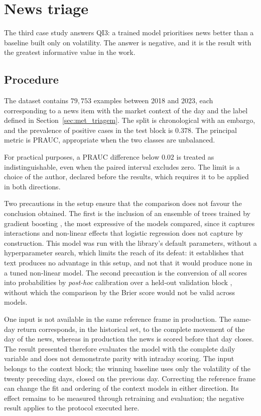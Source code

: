 \section{News triage}
\label{sec:av_qi3}

The third case study answers \gls{QI}3: a trained model prioritises news better than a baseline
built only on volatility. The answer is negative, and it is the result with the greatest
informative value in the work.

\subsection{Procedure}

The dataset contains $79{,}753$ examples between 2018 and 2023, each corresponding to a news item
with the market context of the day and the label defined in Section~\ref{sec:met_triagem}. The
split is chronological with an embargo, and the prevalence of positive cases in the test block is
$0.378$. The principal metric is \gls{PRAUC}, appropriate when the two classes are
unbalanced.

For practical purposes, a \gls{PRAUC} difference below $0.02$ is treated as indistinguishable,
even when the paired interval excludes zero. The limit is a choice of the author, declared before
the results, which requires it to be applied in both directions.

Two precautions in the setup ensure that the comparison does not favour the conclusion obtained.
The first is the inclusion of an ensemble of trees trained by gradient boosting
\autocite{friedman2001gbm}, the most expressive of the models compared, since it captures
interactions and non-linear effects that logistic regression does not capture by construction. This
model was run with the library's default parameters, without a hyperparameter search, which limits
the reach of its defeat: it establishes that text produces no advantage in this setup, and not that
it would produce none in a tuned non-linear model. The second precaution is the conversion of all
scores into probabilities by \emph{post-hoc} calibration over a held-out validation block
\autocite{niculescu2005calibration}, without which the comparison by the Brier score would not be
valid across models.

One input is not available in the same reference frame in production. The same-day return
corresponds, in the historical set, to the complete movement of the day of the news, whereas in
production the news is scored before that day closes. The result presented therefore evaluates the
model with the complete daily variable and does not demonstrate parity with intraday scoring.
The input belongs to the context block; the winning baseline uses only the volatility of the
twenty preceding days, closed on the previous day. Correcting the reference frame can change the
fit and ordering of the context models in either direction. Its effect remains to be measured
through retraining and evaluation; the negative result applies to the protocol executed here.

